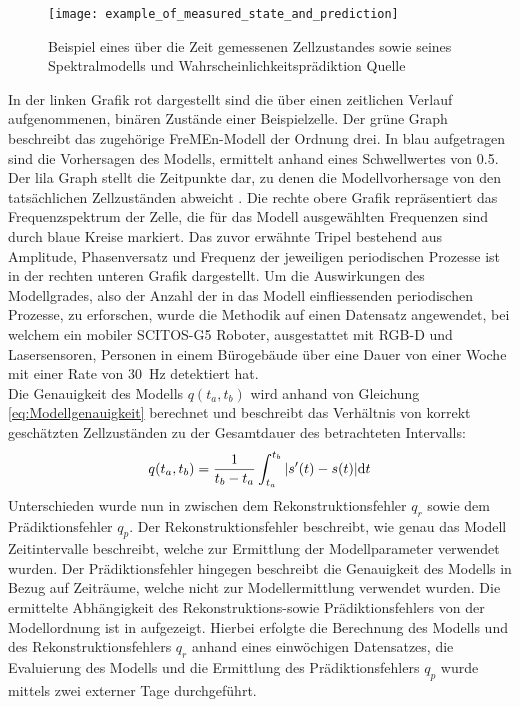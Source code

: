 \begin{figure}[!ht]
	\begin{center}
		\texttt{[image: example\_of\_measured\_state\_and\_prediction]}
		\caption{Beispiel eines über die Zeit gemessenen Zellzustandes sowie seines Spektralmodells und Wahrscheinlichkeitsprädiktion Quelle \cite{Krajnik.2014}}
		\label{fig.FreMEn Beispiel}
	\end{center}
\end{figure}
In der linken Grafik rot dargestellt sind die über einen zeitlichen Verlauf aufgenommenen, binären Zustände einer Beispielzelle. Der grüne Graph beschreibt das zugehörige FreMEn-Modell der Ordnung drei. In blau aufgetragen sind die Vorhersagen des Modells, ermittelt anhand eines Schwellwertes von 0.5. Der lila Graph stellt die Zeitpunkte dar, zu denen die Modellvorhersage von den tatsächlichen Zellzuständen abweicht \cite{Krajnik.2014}. Die rechte obere Grafik repräsentiert das Frequenzspektrum der Zelle, die für das Modell ausgewählten Frequenzen sind durch blaue Kreise markiert. Das zuvor erwähnte Tripel bestehend aus Amplitude, Phasenversatz und Frequenz der jeweiligen periodischen Prozesse ist in der rechten unteren Grafik dargestellt. Um die Auswirkungen des Modellgrades, also der Anzahl der in das Modell einfliessenden periodischen Prozesse, zu erforschen, wurde die Methodik auf einen Datensatz angewendet, bei welchem ein mobiler SCITOS-G5 Roboter, ausgestattet mit RGB-D und Lasersensoren, Personen in einem Bürogebäude über eine Dauer von einer Woche mit einer Rate von \SI{30}{\hertz} detektiert hat. \\
Die Genauigkeit des Modells $q(t_a,t_b)$ wird anhand von Gleichung \ref{eq:Modellgenauigkeit} berechnet und beschreibt das Verhältnis von korrekt geschätzten Zellzuständen zu der Gesamtdauer des betrachteten Intervalls:
\begin{equation}
	q(t_a,t_b) = \frac{1}{t_b - t_a} \int_{t_a}^{t_b} |s'(t) - s(t)| {\mathrm{d}}t
	\label{eq:Modellgenauigkeit}
\end{equation}
Unterschieden wurde nun in \cite{Krajnik.2014} zwischen dem Rekonstruktionsfehler $q_r$ sowie dem Prädiktionsfehler $q_p$. Der Rekonstruktionsfehler beschreibt, wie genau das Modell Zeitintervalle beschreibt, welche zur Ermittlung der Modellparameter verwendet wurden. Der Prädiktionsfehler hingegen beschreibt die Genauigkeit des Modells in Bezug auf Zeiträume, welche nicht zur Modellermittlung verwendet wurden. Die ermittelte Abhängigkeit des Rekonstruktions-sowie Prädiktionsfehlers von der Modellordnung ist in  aufgezeigt. Hierbei erfolgte die Berechnung des Modells und des Rekonstruktionsfehlers $q_r$ anhand eines einwöchigen Datensatzes, die Evaluierung des Modells und die Ermittlung des Prädiktionsfehlers $q_p$ wurde mittels zwei externer Tage durchgeführt.  \\
